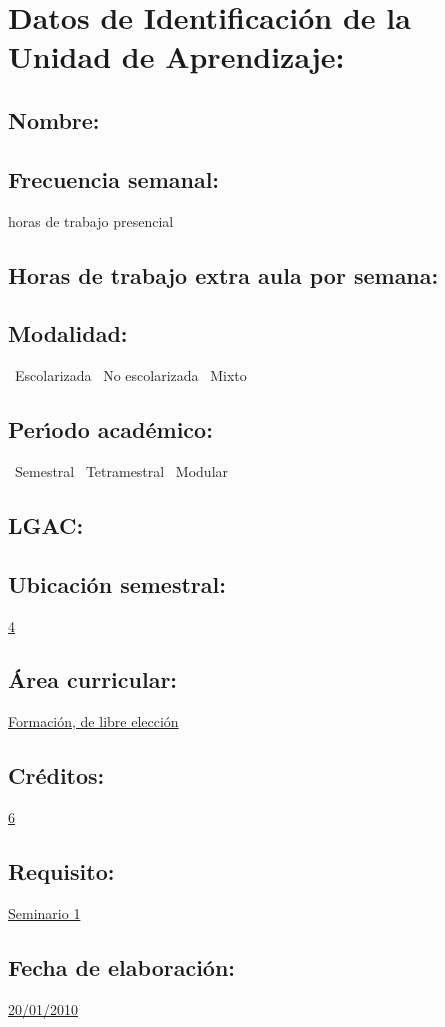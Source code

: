 \documentclass[10 pt]{article}
\begin{document}


\section{Datos de Identificaci\'{o}n de la Unidad de Aprendizaje:}
\subsection{Nombre:} 
\subsection{Frecuencia semanal:} horas de trabajo presencial 
\subsection{Horas de trabajo extra aula por semana:} 
\subsection{Modalidad:} \yes~Escolarizada \no~No escolarizada \no~Mixto
\subsection{Per\'{\i}odo acad\'{e}mico:} \yes~Semestral
\no~Tetramestral \no~Modular
\subsection{LGAC:} \underline{\odsi}
\subsection{Ubicaci\'{o}n semestral:} \underline{4}
\subsection{\'{A}rea curricular:} \underline{Formaci\'{o}n, de libre elecci\'{o}n}
\subsection{Cr\'{e}ditos:} \underline{6}
\subsection{Requisito:} \underline{Seminario 1}
\subsection{Fecha de elaboraci\'{o}n:} \underline{20/01/2010}
\end{document}

